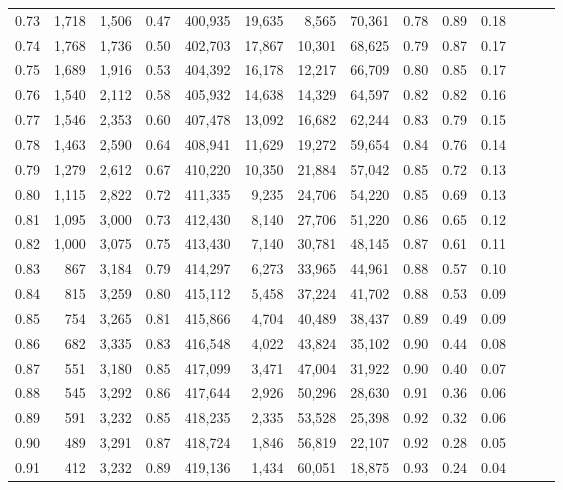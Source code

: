 \begin{tabular}{rrrrrrrrrrrrrr}
0.73 &  1,718 &  1,506 &  0.47 &  400,935 &   19,635 &   8,565 &  70,361 &  0.78 &  0.89 &      0.18 \\
0.74 &  1,768 &  1,736 &  0.50 &  402,703 &   17,867 &  10,301 &  68,625 &  0.79 &  0.87 &      0.17 \\
0.75 &  1,689 &  1,916 &  0.53 &  404,392 &   16,178 &  12,217 &  66,709 &  0.80 &  0.85 &      0.17 \\
0.76 &  1,540 &  2,112 &  0.58 &  405,932 &   14,638 &  14,329 &  64,597 &  0.82 &  0.82 &      0.16 \\
0.77 &  1,546 &  2,353 &  0.60 &  407,478 &   13,092 &  16,682 &  62,244 &  0.83 &  0.79 &      0.15 \\
0.78 &  1,463 &  2,590 &  0.64 &  408,941 &   11,629 &  19,272 &  59,654 &  0.84 &  0.76 &      0.14 \\
0.79 &  1,279 &  2,612 &  0.67 &  410,220 &   10,350 &  21,884 &  57,042 &  0.85 &  0.72 &      0.13 \\
0.80 &  1,115 &  2,822 &  0.72 &  411,335 &    9,235 &  24,706 &  54,220 &  0.85 &  0.69 &      0.13 \\
0.81 &  1,095 &  3,000 &  0.73 &  412,430 &    8,140 &  27,706 &  51,220 &  0.86 &  0.65 &      0.12 \\
0.82 &  1,000 &  3,075 &  0.75 &  413,430 &    7,140 &  30,781 &  48,145 &  0.87 &  0.61 &      0.11 \\
0.83 &    867 &  3,184 &  0.79 &  414,297 &    6,273 &  33,965 &  44,961 &  0.88 &  0.57 &      0.10 \\
0.84 &    815 &  3,259 &  0.80 &  415,112 &    5,458 &  37,224 &  41,702 &  0.88 &  0.53 &      0.09 \\
0.85 &    754 &  3,265 &  0.81 &  415,866 &    4,704 &  40,489 &  38,437 &  0.89 &  0.49 &      0.09 \\
0.86 &    682 &  3,335 &  0.83 &  416,548 &    4,022 &  43,824 &  35,102 &  0.90 &  0.44 &      0.08 \\
0.87 &    551 &  3,180 &  0.85 &  417,099 &    3,471 &  47,004 &  31,922 &  0.90 &  0.40 &      0.07 \\
0.88 &    545 &  3,292 &  0.86 &  417,644 &    2,926 &  50,296 &  28,630 &  0.91 &  0.36 &      0.06 \\
0.89 &    591 &  3,232 &  0.85 &  418,235 &    2,335 &  53,528 &  25,398 &  0.92 &  0.32 &      0.06 \\
0.90 &    489 &  3,291 &  0.87 &  418,724 &    1,846 &  56,819 &  22,107 &  0.92 &  0.28 &      0.05 \\
0.91 &    412 &  3,232 &  0.89 &  419,136 &    1,434 &  60,051 &  18,875 &  0.93 &  0.24 &      0.04 \\

\end{tabular}
